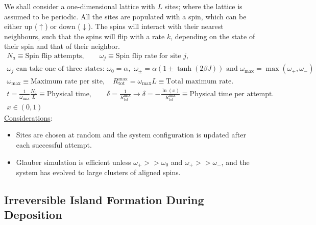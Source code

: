 \documentclass[letterpaper]{article}
\begin{document}
    We shall consider a one-dimensional lattice with $L$ sites; where the
    lattice is assumed to be periodic. All the sites are populated with a spin,
    which can be either up ($\uparrow$) or down ($\downarrow$). The spins will
    interact with their nearest neighbours, such that the spins will flip with a
    rate $k$, depending on the state of their spin and that of their neighbor.
    \begin{gather*}
        N_{a}\equiv\text{Spin flip attempts},\qquad
        \omega_j\equiv\text{Spin flip rate for site }j,\\
        \omega_{j}\text{ can take one of three states: }
        \omega_0 = \alpha,\,\,
        \omega_{\pm} = \alpha\left(
        1 \pm \tanh\left(2\beta J\right)
        \right)\,\,\text{and}\,\, \omega_{\text{max}} = 
        \max\left(\omega_{+},\omega_{-}\right)\\
        \omega_{\text{max}}\equiv\text{Maximum rate per site},\quad
        R_{\text{tot}}^{\text{max}}=\omega_{\text{max}}L\equiv
        \text{Total maximum rate.}\\
        t = \frac{1}{\omega_{\text{max}}}
        \frac{N_{a}}{L}\equiv\text{Physical time},\qquad
        \delta = \frac{1}{R_{\text{tot}}^{\text{max}}}\rightarrow
        \delta = -\frac{\ln\left(x\right)}{R_{\text{tot}}^{\text{max}}}\equiv
        \text{{Physical time per attempt.}}\\
        x\in\left(0,1\right)
    \end{gather*}
    \underline{Considerations}:
    \begin{itemize}
        \item Sites are chosen at random and the system configuration is updated
        after each successful attempt.
        \item Glauber simulation is efficient unless $\omega_{+}>>\omega_{0}$
        and $\omega_{+}>>\omega_{-}$, and the system has evolved to large
        clusters of aligned spins.
    \end{itemize}


    \subsection{Irreversible Island Formation During Deposition}
\end{document}
